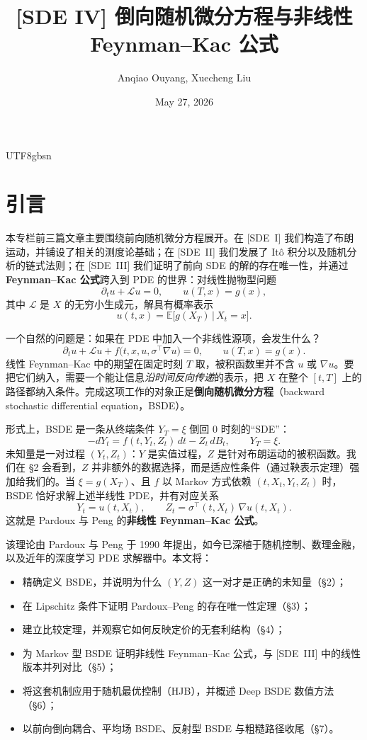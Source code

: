 \documentclass{article}
\title{[SDE IV] 倒向随机微分方程与非线性 Feynman--Kac 公式}
\author{Anqiao Ouyang, Xuecheng Liu}
\date{May 27, 2026}
\theoremstyle{plain}
\theoremstyle{definition}
\theoremstyle{remark}
\newcommand{\E}{\mathbb{E}}
\newcommand{\Lc}{\mathcal{L}}
\begin{document}
\begin{CJK*}{UTF8}{gbsn}

\maketitle

\section{引言}

本专栏前三篇文章主要围绕前向随机微分方程展开。在 [SDE~I] 我们构造了布朗运动，并铺设了相关的测度论基础；在 [SDE~II] 我们发展了 It\^o 积分以及随机分析的链式法则；在 [SDE~III] 我们证明了前向 SDE 的解的存在唯一性，并通过 \textbf{Feynman--Kac 公式}跨入到 PDE 的世界：对线性抛物型问题
\[
  \partial_t u + \Lc u = 0, \qquad u(T,x) = g(x),
\]
其中 $\Lc$ 是 $X$ 的无穷小生成元，解具有概率表示
\[
  u(t,x) = \E\big[g(X_T) \,\big|\, X_t = x\big].
\]

一个自然的问题是：如果在 PDE 中加入一个非线性源项，会发生什么？
\[
  \partial_t u + \Lc u + f\!\big(t, x, u, \sigma^{\top}\nabla u\big) = 0, \qquad u(T, x) = g(x).
\]
线性 Feynman--Kac 中的期望在固定时刻 $T$ 取，被积函数里并不含 $u$ 或 $\nabla u$。要把它们纳入，需要一个能让信息\emph{沿时间反向传递}的表示，把 $X$ 在整个 $[t, T]$ 上的路径都纳入条件。完成这项工作的对象正是\textbf{倒向随机微分方程}（backward stochastic differential equation，BSDE）。

形式上，BSDE 是一条从终端条件 $Y_T = \xi$ 倒回 $0$ 时刻的“SDE”：
\[
  -dY_t = f(t, Y_t, Z_t)\,dt - Z_t\, dB_t, \qquad Y_T = \xi.
\]
未知量是一对过程 $(Y_t, Z_t)$：$Y$ 是实值过程，$Z$ 是针对布朗运动的被积函数。我们在 \S2 会看到，$Z$ 并非额外的数据选择，而是适应性条件（通过鞅表示定理）强加给我们的。当 $\xi = g(X_T)$、且 $f$ 以 Markov 方式依赖 $(t, X_t, Y_t, Z_t)$ 时，BSDE 恰好求解上述半线性 PDE，并有对应关系
\[
  Y_t = u(t, X_t), \qquad Z_t = \sigma^{\top}(t, X_t)\, \nabla u(t, X_t).
\]
这就是 Pardoux 与 Peng 的\textbf{非线性 Feynman--Kac 公式}。

该理论由 Pardoux 与 Peng 于 1990 年提出\cite{pp1990}，如今已深植于随机控制、数理金融，以及近年的深度学习 PDE 求解器中。本文将：

\begin{itemize}
  \item 精确定义 BSDE，并说明为什么 $(Y, Z)$ 这一对才是正确的未知量（\S2）；
  \item 在 Lipschitz 条件下证明 Pardoux--Peng 的存在唯一性定理（\S3）；
  \item 建立比较定理，并观察它如何反映定价的无套利结构（\S4）；
  \item 为 Markov 型 BSDE 证明非线性 Feynman--Kac 公式，与 [SDE~III] 中的线性版本并列对比（\S5）；
  \item 将这套机制应用于随机最优控制（HJB），并概述 Deep BSDE 数值方法（\S6）；
  \item 以前向倒向耦合、平均场 BSDE、反射型 BSDE 与粗糙路径收尾（\S7）。
\end{itemize}


\end{CJK*}
\end{document}
